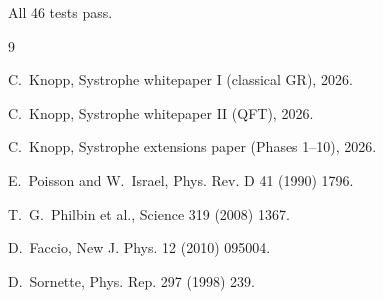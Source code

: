 \documentclass[11pt,a4paper]{article}
\begin{document}
All 46 tests pass.


\begin{thebibliography}{9}

C.~Knopp, Systrophe whitepaper I (classical GR), 2026.

C.~Knopp, Systrophe whitepaper II (QFT), 2026.

C.~Knopp, Systrophe extensions paper (Phases 1--10), 2026.

E.~Poisson and W.~Israel, Phys. Rev. D 41 (1990) 1796.

T.~G.~Philbin et al., Science 319 (2008) 1367.

D.~Faccio, New J. Phys. 12 (2010) 095004.

D.~Sornette, Phys. Rep. 297 (1998) 239.

\end{thebibliography}
\end{document}
